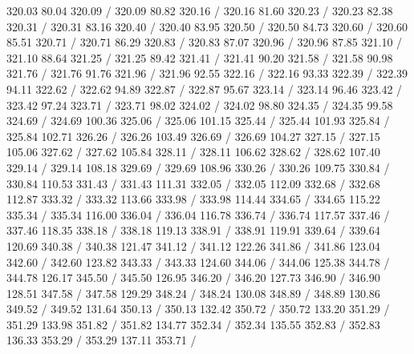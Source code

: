 { 320.03 80.04 320.09 /
 320.09 80.82 320.16 /
 320.16 81.60 320.23 /
 320.23 82.38 320.31 /
 320.31 83.16 320.40 /
 320.40 83.95 320.50 /
 320.50 84.73 320.60 /
 320.60 85.51 320.71 /
 320.71 86.29 320.83 /
 320.83 87.07 320.96 /
 320.96 87.85 321.10 /
 321.10 88.64 321.25 /
 321.25 89.42 321.41 /
 321.41 90.20 321.58 /
 321.58 90.98 321.76 /
 321.76 91.76 321.96 /
 321.96 92.55 322.16 /
 322.16 93.33 322.39 /
 322.39 94.11 322.62 /
 322.62 94.89 322.87 /
 322.87 95.67 323.14 /
 323.14 96.46 323.42 /
 323.42 97.24 323.71 /
 323.71 98.02 324.02 /
 324.02 98.80 324.35 /
 324.35 99.58 324.69 /
 324.69 100.36 325.06 /
 325.06 101.15 325.44 /
 325.44 101.93 325.84 /
 325.84 102.71 326.26 /
 326.26 103.49 326.69 /
 326.69 104.27 327.15 /
 327.15 105.06 327.62 /
 327.62 105.84 328.11 /
 328.11 106.62 328.62 /
 328.62 107.40 329.14 /
 329.14 108.18 329.69 /
 329.69 108.96 330.26 /
 330.26 109.75 330.84 /
 330.84 110.53 331.43 /
 331.43 111.31 332.05 /
 332.05 112.09 332.68 /
 332.68 112.87 333.32 /
 333.32 113.66 333.98 /
 333.98 114.44 334.65 /
 334.65 115.22 335.34 /
 335.34 116.00 336.04 /
 336.04 116.78 336.74 /
 336.74 117.57 337.46 /
 337.46 118.35 338.18 /
 338.18 119.13 338.91 /
 338.91 119.91 339.64 /
 339.64 120.69 340.38 /
 340.38 121.47 341.12 /
 341.12 122.26 341.86 /
 341.86 123.04 342.60 /
 342.60 123.82 343.33 /
 343.33 124.60 344.06 /
 344.06 125.38 344.78 /
 344.78 126.17 345.50 /
 345.50 126.95 346.20 /
 346.20 127.73 346.90 /
 346.90 128.51 347.58 /
 347.58 129.29 348.24 /
 348.24 130.08 348.89 /
 348.89 130.86 349.52 /
 349.52 131.64 350.13 /
 350.13 132.42 350.72 /
 350.72 133.20 351.29 /
 351.29 133.98 351.82 /
 351.82 134.77 352.34 /
 352.34 135.55 352.83 /
 352.83 136.33 353.29 /
 353.29 137.11 353.71 /
}
